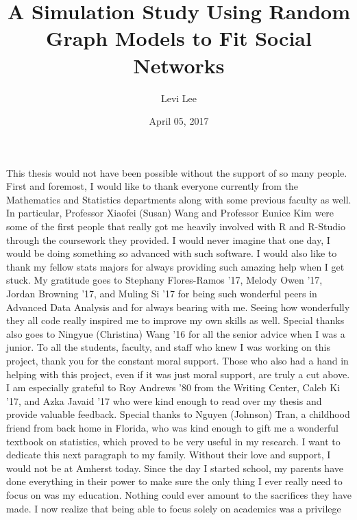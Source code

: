 \documentclass[12pt,twoside]{amherstthesis}
\title{A Simulation Study Using Random Graph Models to Fit Social Networks}
\author{Levi Lee}
\date{April 05, 2017}
\begin{document}
      \maketitle
  
  \frontmatter %
  \pagestyle{empty} %

      \begin{acknowledgements}
      This thesis would not have been possible without the support of so many
      people. First and foremost, I would like to thank everyone currently
      from the Mathematics and Statistics departments along with some previous
      faculty as well. In particular, Professor Xiaofei (Susan) Wang and
      Professor Eunice Kim were some of the first people that really got me
      heavily involved with R and R-Studio through the coursework they
      provided. I would never imagine that one day, I would be doing something
      so advanced with such software. I would also like to thank my fellow
      stats majors for always providing such amazing help when I get stuck. My
      gratitude goes to Stephany Flores-Ramos '17, Melody Owen '17, Jordan
      Browning '17, and Muling Si '17 for being such wonderful peers in
      Advanced Data Analysis and for always bearing with me. Seeing how
      wonderfully they all code really inspired me to improve my own skills as
      well. Special thanks also goes to Ningyue (Christina) Wang '16 for all
      the senior advice when I was a junior. To all the students, faculty, and
      staff who knew I was working on this project, thank you for the constant
      moral support. Those who also had a hand in helping with this project,
      even if it was just moral support, are truly a cut above. I am
      especially grateful to Roy Andrews '80 from the Writing Center, Caleb Ki
      '17, and Azka Javaid '17 who were kind enough to read over my thesis and
      provide valuable feedback. Special thanks to Nguyen (Johnson) Tran, a
      childhood friend from back home in Florida, who was kind enough to gift
      me a wonderful textbook on statistics, which proved to be very useful in
      my research. I want to dedicate this next paragraph to my family.
      Without their love and support, I would not be at Amherst today. Since
      the day I started school, my parents have done everything in their power
      to make sure the only thing I ever really need to focus on was my
      education. Nothing could ever amount to the sacrifices they have made. I
      now realize that being able to focus solely on academics was a privilege

\end{acknowledgements}
\end{document}
